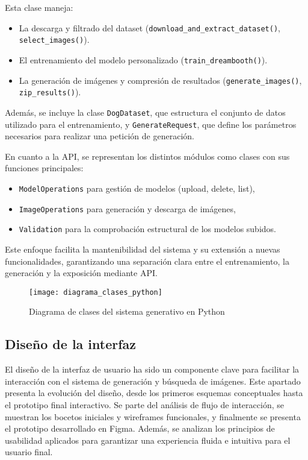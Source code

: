 Esta clase maneja:
\begin{itemize}
\item La descarga y filtrado del dataset (\texttt{download\_and\_extract\_dataset()}, \texttt{select\_images()}).
\item El entrenamiento del modelo personalizado (\texttt{train\_dreambooth()}).
\item La generación de imágenes y compresión de resultados (\texttt{generate\_images()}, \texttt{zip\_results()}).
\end{itemize}

Además, se incluye la clase \texttt{DogDataset}, que estructura el conjunto de datos utilizado para el entrenamiento, y \texttt{GenerateRequest}, que define los parámetros necesarios para realizar una petición de generación.

En cuanto a la API, se representan los distintos módulos como clases con sus funciones principales:
\begin{itemize}
\item \texttt{ModelOperations} para gestión de modelos (upload, delete, list),
\item \texttt{ImageOperations} para generación y descarga de imágenes,
\item \texttt{Validation} para la comprobación estructural de los modelos subidos.
\end{itemize}

Este enfoque facilita la mantenibilidad del sistema y su extensión a nuevas funcionalidades, garantizando una separación clara entre el entrenamiento, la generación y la exposición mediante API.

\begin{figure}[H]
\centering
\texttt{[image: diagrama\_clases\_python]}
\caption{Diagrama de clases del sistema generativo en Python}
\label{fig:clases-python}
\end{figure}


\subsection{Diseño de la interfaz}
El diseño de la interfaz de usuario ha sido un componente clave para facilitar la interacción con el sistema de generación y búsqueda de imágenes. Este apartado presenta la evolución del diseño, desde los primeros esquemas conceptuales hasta el prototipo final interactivo. Se parte del análisis de flujo de interacción, se muestran los bocetos iniciales y wireframes funcionales, y finalmente se presenta el prototipo desarrollado en Figma. Además, se analizan los principios de usabilidad aplicados para garantizar una experiencia fluida e intuitiva para el usuario final.

